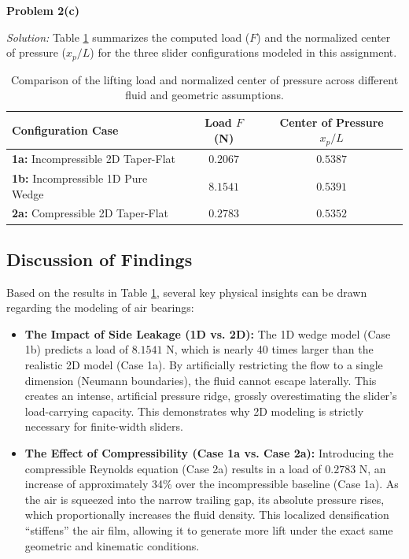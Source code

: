 \documentclass[11pt]{article}
\newenvironment{problem}[2][Problem]
    { \begin{mdframed}[backgroundcolor=gray!20] \textbf{#1 #2} \\}
    {  \end{mdframed}}
\newenvironment{solution}
    {\textit{Solution:}}
    {}
\begin{document}
\begin{problem}{2(c)}

\end{problem}

\begin{solution}
Table \ref{tab:final_results} summarizes the computed load ($F$) and the normalized center of pressure ($x_p/L$) for the three slider configurations modeled in this assignment.

\begin{table}[H]
    \centering
    \renewcommand{\arraystretch}{1.3}
    \begin{tabular}{lcc}
        \toprule
        \textbf{Configuration Case} & \textbf{Load $F$ (N)} & \textbf{Center of Pressure $x_p/L$} \\
        \midrule
        \textbf{1a:} Incompressible 2D Taper-Flat & $0.2067$ & $0.5387$ \\
        \textbf{1b:} Incompressible 1D Pure Wedge & $8.1541$ & $0.5391$ \\
        \textbf{2a:} Compressible 2D Taper-Flat   & $0.2783$ & $0.5352$ \\
        \bottomrule
    \end{tabular}
    \caption{Comparison of the lifting load and normalized center of pressure across different fluid and geometric assumptions.}
    \label{tab:final_results}
\end{table}

\subsection*{Discussion of Findings}
Based on the results in Table \ref{tab:final_results}, several key physical insights can be drawn regarding the modeling of air bearings:

\begin{itemize}
    \item \textbf{The Impact of Side Leakage (1D vs. 2D):} 
    The 1D wedge model (Case 1b) predicts a load of $8.1541$ N, which is nearly 40 times larger than the realistic 2D model (Case 1a). By artificially restricting the flow to a single dimension (Neumann boundaries), the fluid cannot escape laterally. This creates an intense, artificial pressure ridge, grossly overestimating the slider's load-carrying capacity. This demonstrates why 2D modeling is strictly necessary for finite-width sliders.
    
    \item \textbf{The Effect of Compressibility (Case 1a vs. Case 2a):} 
    Introducing the compressible Reynolds equation (Case 2a) results in a load of $0.2783$ N, an increase of approximately 34\% over the incompressible baseline (Case 1a). As the air is squeezed into the narrow trailing gap, its absolute pressure rises, which proportionally increases the fluid density. This localized densification ``stiffens'' the air film, allowing it to generate more lift under the exact same geometric and kinematic conditions.
    

\end{itemize}
\end{solution}
\end{document}
